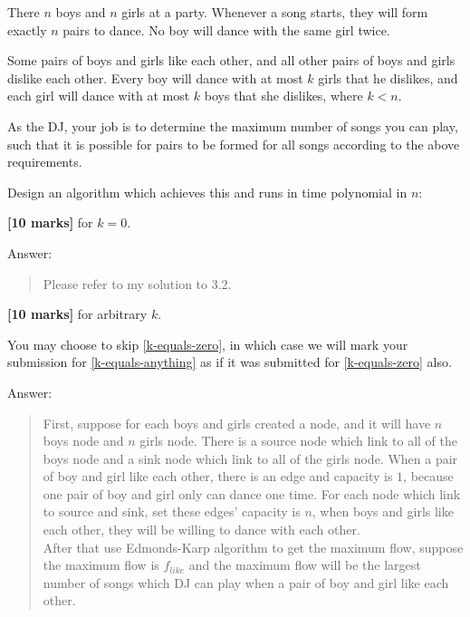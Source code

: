 \documentclass{article}
\begin{document}
\setcounter{question}{2}

\begin{Question}

There $n$ boys and $n$ girls at a party. Whenever a song starts, they will form exactly $n$ pairs to dance. No boy will dance with the same girl twice.

Some pairs of boys and girls like each other, and all other pairs of boys and girls dislike each other. Every boy will dance with at most $k$ girls that he dislikes, and each girl will dance with at most $k$ boys that she dislikes, where $k < n$.

As the DJ, your job is to determine the maximum number of songs you can play, such that it is possible for pairs to be formed for all songs according to the above requirements.

Design an algorithm which achieves this and runs in time polynomial in $n$:

\begin{Subquestion} \label{k-equals-zero}
\textbf{[10 marks]} for $k=0$.

\begin{answer}
Answer:
\begin{quote}
    Please refer to my solution to 3.2.
\end{quote}
\end{answer}
\end{Subquestion}

\begin{Subquestion} \label{k-equals-anything}
\textbf{[10 marks]} for arbitrary $k$.

You may choose to skip \ref{k-equals-zero}, in which case we will mark your submission for \ref{k-equals-anything} as if it was submitted for \ref{k-equals-zero} also.

\begin{answer}
Answer:
\begin{quote}
    First, suppose for each boys and girls created a node, and it will have  $n$ boys node and $n$ girls node. There is a source node which link to all of the boys node and a sink node which link to all of the girls node. When a pair of boy and girl like each other, there is an edge and capacity is $1$, because one pair of boy and girl only can dance one time. For each node which link to source and sink, set these edges' capacity is $n$, when boys and girls like each other, they will be willing to dance with each other. \\
    After that use Edmonds-Karp algorithm to get the maximum flow, suppose the maximum flow is $f_{like}$ and the maximum flow will be the largest number of songs which DJ can play when a pair of boy and girl like each other.\\
    

\end{quote}
\end{answer}
\end{Subquestion}
\end{Question}
\end{document}
